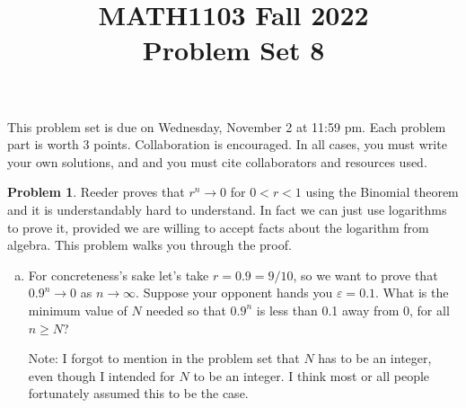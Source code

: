 \documentclass[11pt,oneside]{amsart}
\title{MATH1103 Fall 2022\\
Problem Set 8}
\theoremstyle{definition}
\newtheorem{problem}{Problem}
\theoremstyle{plain}
\newcommand{\eps}{\varepsilon}
\begin{document}
    \maketitle
    This problem set is due on Wednesday, November 2 at 11:59 pm. Each problem part is worth 3 points. Collaboration is encouraged. In all cases, you must write your own solutions, and and you must cite collaborators and resources used.

    \begin{problem}
        Reeder proves that $r^n\to 0$ for $0<r<1$ using the Binomial theorem and it is understandably hard to understand. In fact we can just use logarithms to prove it, provided we are willing to accept facts about the logarithm from algebra. This problem walks you through the proof.

        \begin{enumerate}[(a)]
            \item For concreteness's sake let's take $r=0.9=9/10$, so we want to prove that $0.9^n\to 0$ as $n\to\infty$. Suppose your opponent hands you $\eps=0.1$. What is the minimum value of $N$ needed so that $0.9^n$ is less than 0.1 away from 0, for all $n\geq N$?
            \begin{solution}
                Note: I forgot to mention in the problem set that $N$ has to be an integer, even though I intended for $N$ to be an integer. I think most or all people fortunately assumed this to be the case.
                

\end{solution}
\end{enumerate}
\end{problem}
\end{document}
